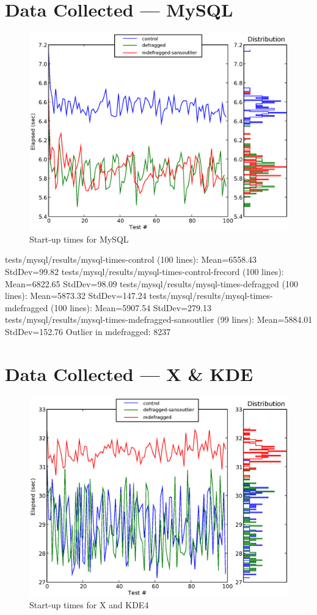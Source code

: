 \documentclass[10pt,twocolumn,letterpaper]{article}
\begin{document}
\section{Data Collected --- MySQL}

\begin{figure}[!hbtp]
\includegraphics[scale=0.75]{mysql-chart.eps}
\caption{Start-up times for MySQL}
\label{mysqlchart}
\end{figure}

tests/mysql/results/mysql-times-control (100 lines):  Mean=6558.43  StdDev=99.82
tests/mysql/results/mysql-times-control-frecord (100 lines):  Mean=6822.65  StdDev=98.09
tests/mysql/results/mysql-times-defragged (100 lines):  Mean=5873.32  StdDev=147.24
tests/mysql/results/mysql-times-mdefragged (100 lines):  Mean=5907.54  StdDev=279.13
tests/mysql/results/mysql-times-mdefragged-sansoutlier (99 lines):  Mean=5884.01  StdDev=152.76
Outlier in mdefragged: 8237

\section{Data Collected --- X \& KDE}

\begin{figure}[!hbtp]
\includegraphics[scale=0.75]{kde4-chart.eps}
\caption{Start-up times for X and KDE4}
\label{kde4chart}
\end{figure}
\end{document}

